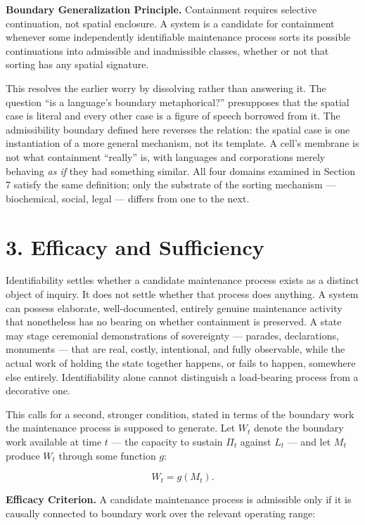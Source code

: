 \documentclass[11pt]{article}
\theoremstyle{plain}
\begin{document}
\textbf{Boundary Generalization Principle.} Containment requires selective continuation, not spatial enclosure. A system is a candidate for containment whenever some independently identifiable maintenance process sorts its possible continuations into admissible and inadmissible classes, whether or not that sorting has any spatial signature.

This resolves the earlier worry by dissolving rather than answering it. The question ``is a language's boundary metaphorical?'' presupposes that the spatial case is literal and every other case is a figure of speech borrowed from it. The admissibility boundary defined here reverses the relation: the spatial case is one instantiation of a more general mechanism, not its template. A cell's membrane is not what containment ``really'' is, with languages and corporations merely behaving \emph{as if} they had something similar. All four domains examined in Section 7 satisfy the same definition; only the substrate of the sorting mechanism --- biochemical, social, legal --- differs from one to the next.

\section*{3. Efficacy and Sufficiency}

Identifiability settles whether a candidate maintenance process exists as a distinct object of inquiry. It does not settle whether that process does anything. A system can possess elaborate, well-documented, entirely genuine maintenance activity that nonetheless has no bearing on whether containment is preserved. A state may stage ceremonial demonstrations of sovereignty --- parades, declarations, monuments --- that are real, costly, intentional, and fully observable, while the actual work of holding the state together happens, or fails to happen, somewhere else entirely. Identifiability alone cannot distinguish a load-bearing process from a decorative one.

This calls for a second, stronger condition, stated in terms of the boundary work the maintenance process is supposed to generate. Let \(W_t\) denote the boundary work available at time \(t\) --- the capacity to sustain \(\Pi_t\) against \(L_t\) --- and let \(M_t\) produce \(W_t\) through some function \(g\):

\[W_t = g(M_t).\]

\textbf{Efficacy Criterion.} A candidate maintenance process is admissible only if it is causally connected to boundary work over the relevant operating range:
\end{document}
